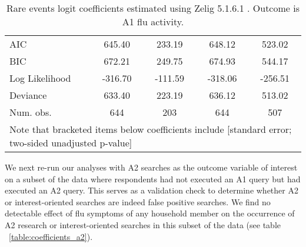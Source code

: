 \documentclass[12pt]{article}
\begin{document}
\begin{table}
\begin{center}
\begin{tabular}{l c c c c }
\hline
AIC            & 645.40          & 233.19          & 648.12          & 523.02          \\
BIC            & 672.21          & 249.75          & 674.93          & 544.17          \\
Log Likelihood & -316.70         & -111.59         & -318.06         & -256.51         \\
Deviance       & 633.40          & 223.19          & 636.12          & 513.02          \\
Num. obs.      & 644             & 203             & 644             & 507             \\
\hline
\multicolumn{5}{l}{\scriptsize{Note that bracketed items below coefficients include [standard error; two-sided unadjusted p-value]}}
\end{tabular}
\caption{Rare events logit coefficients estimated using Zelig 5.1.6.1 \citep{choirat_etal_2020}. Outcome is A1 flu activity.}
\label{table:coefficients_a1}
\end{center}
\end{table}

\clearpage
\newpage

We next re-run our analyses with A2 searches as the outcome variable of interest on a subset of the data where respondents had not executed an A1 query but had executed an A2 query. This serves as a validation check to determine whether A2 or interest-oriented searches are indeed false positive searches. We find no detectable effect of flu symptoms of any household member on the occurrence of A2 research or interest-oriented searches in this subset of the data (see table ~\ref{table:coefficients_a2}).  
\end{document}
